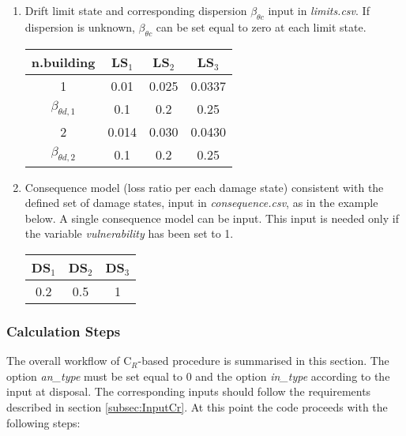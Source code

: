 \begin{enumerate}
\item Drift limit state and corresponding dispersion $\beta_{\theta c}$ input in \textit{limits.csv}. If dispersion is unknown, $\beta_{\theta c}$ can be set equal to zero at each limit state.
	\begin{table}[H]
	\centering
	\begin{tabular}{|c|c|c|c|} \hline
	\textbf{n.building} & \textbf{LS$_1$} &	\textbf{LS$_2$} &	\textbf{LS$_3$} \\ \hline
	1 & 0.01 &	0.025 & 0.0337\\ \hline
	$\beta_{\theta d, 1}$ &	0.1 & 0.2 & 0.25\\ \hline
	2 & 0.014 &	0.030 & 0.0430\\ \hline
	$\beta_{\theta d, 2}$ &	0.1 & 0.2 & 0.25\\ \hline
	\end{tabular}
	\end{table}

\item Consequence model (loss ratio per each damage state) consistent with the defined set of damage states, input in \textit{consequence.csv}, as in the example below. A single consequence model can be input. This input is needed only if the variable \textit{vulnerability} has been set to 1.
	\begin{table}[H]
	\centering
	\begin{tabular}{|c|c|c|} \hline
	\textbf{DS$_1$} & \textbf{DS$_2$} & \textbf{DS$_3$} \\ \hline
	0.2	& 0.5	 & 1\\ \hline
	\end{tabular}
	\end{table}
	
\end{enumerate}

\subsubsection{Calculation Steps}
The overall workflow of C$_R$-based procedure is summarised in this section. The option \textit{an\_type} must be set equal to 0 and the option \textit{in\_type} according to the input at disposal. The corresponding inputs should follow the requirements described in section \ref{subsec:InputCr}. At this point the code proceeds with the following steps:

